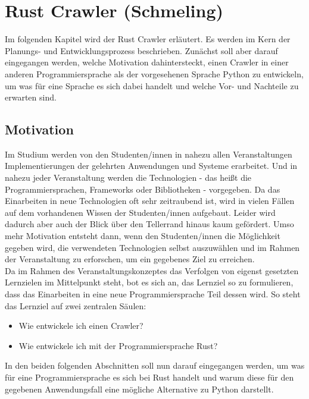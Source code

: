 \chapter{Rust Crawler \small(Schmeling)}
\label{cha:rust}
Im folgenden Kapitel wird der Rust Crawler erläutert. Es werden im Kern der
Planungs- und Entwicklungsprozess beschrieben. Zunächst soll aber darauf
eingegangen werden, welche Motivation dahintersteckt, einen Crawler in einer
anderen Programmiersprache als der vorgesehenen Sprache Python\cite{python}
zu entwickeln, um was für eine Sprache es sich dabei handelt und welche Vor- und
Nachteile zu erwarten sind.


\section{Motivation}
\label{sec:rust_motivation}
Im Studium werden von den Studenten/innen in nahezu allen Veranstaltungen
Implementierungen der gelehrten Anwendungen und Systeme erarbeitet. Und in
nahezu jeder Veranstaltung werden die Technologien - das heißt die
Programmiersprachen, Frameworks oder Bibliotheken - vorgegeben. Da das
Einarbeiten in neue Technologien oft sehr zeitraubend ist, wird in vielen
Fällen auf dem vorhandenen Wissen der Studenten/innen aufgebaut. Leider wird
dadurch aber auch der Blick über den Tellerrand hinaus kaum gefördert. Umso
mehr Motivation entsteht dann, wenn den Studenten/innen die Möglichkeit
gegeben wird, die verwendeten Technologien selbst auszuwählen und im Rahmen
der Veranstaltung zu erforschen, um ein gegebenes Ziel zu erreichen.\\
Da im Rahmen des Veranstaltungskonzeptes das Verfolgen von eigenst gesetzten
Lernzielen im Mittelpunkt steht, bot es sich an, das Lernziel so zu
formulieren, dass das Einarbeiten in eine neue Programmiersprache Teil dessen
wird. So steht das Lernziel auf zwei zentralen Säulen:

\begin{itemize}
	\item Wie entwickele ich einen Crawler?
	\item Wie entwickele ich mit der Programmiersprache Rust\cite{rust}?
\end{itemize}

In den beiden folgenden Abschnitten soll nun darauf eingegangen werden, um
was für eine Programmiersprache es sich bei Rust handelt und warum diese für
den gegebenen Anwendungsfall eine mögliche Alternative zu Python darstellt.

